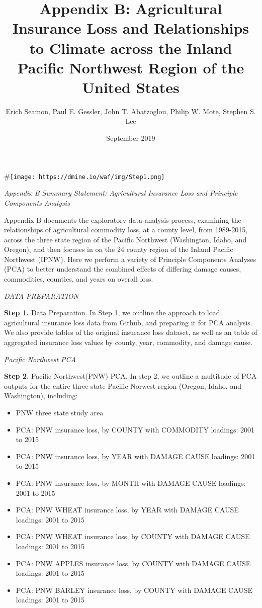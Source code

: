 \documentclass[]{article}
\title{Appendix B: Agricultural Insurance Loss and Relationships to Climate
across the Inland Pacific Northwest Region of the United States}
\author{Erich Seamon, Paul E. Gessler, John T. Abatzoglou, Philip W. Mote,
Stephen S. Lee}
\date{September 2019}
\begin{document}
\maketitle

\#\texttt{[image: https://dmine.io/waf/img/Step1.png]}

\emph{Appendix B Summary Statement: Agricultural Insurance Loss and
Principle Components Analysis}

Appendix B documents the exploratory data analysis process, examining
the relationships of agricultural commodity loss, at a county level,
from 1989-2015, across the three state region of the Pacific Northwest
(Washington, Idaho, and Oregon), and then focuses in on the 24 county
region of the Inland Pacific Northwest (IPNW). Here we perform a variety
of Principle Components Analyses (PCA) to better understand the combined
effects of differing damage causes, commodities, counties, and years on
overall loss.

\emph{DATA PREPARATION}

\textbf{Step 1.} Data Preparation. In Step 1, we outline the approach to
load agricultural insurance loss data from Github, and preparing it for
PCA analysis. We also provide tables of the original insurance loss
dataset, as well as an table of aggregated insurance loss values by
county, year, commodity, and damage cause.

\emph{Pacific Northwest PCA}

\textbf{Step 2.} Pacific Northwest(PNW) PCA. In step 2, we outline a
multitude of PCA outputs for the entire three state Pacific Norwest
region (Oregon, Idaho, and Washington), including:

\begin{itemize}
\item
  PNW three state study area
\item
  PCA: PNW insurance loss, by COUNTY with COMMODITY loadings: 2001 to
  2015
\item
  PCA: PNW insurance loss, by YEAR with DAMAGE CAUSE loadings: 2001 to
  2015
\item
  PCA: PNW insurance loss, by MONTH with DAMAGE CAUSE loadings: 2001 to
  2015
\item
  PCA: PNW WHEAT insurance loss, by YEAR with DAMAGE CAUSE loadings:
  2001 to 2015
\item
  PCA: PNW WHEAT insurance loss, by COUNTY with DAMAGE CAUSE loadings:
  2001 to 2015
\item
  PCA: PNW APPLES insurance loss, by COUNTY with DAMAGE CAUSE loadings:
  2001 to 2015
\item
  PCA: PNW BARLEY insurance loss, by COUNTY with DAMAGE CAUSE loadings:
  2001 to 2015
\end{itemize}
\end{document}
